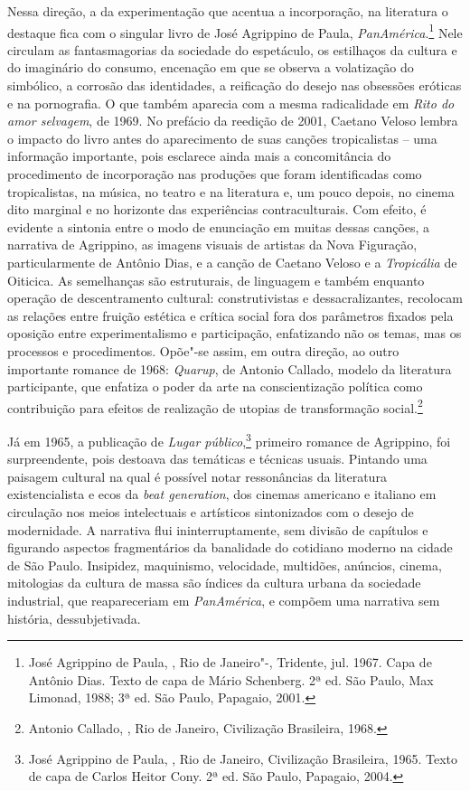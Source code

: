 Nessa direção, a da experimentação que acentua a incorporação, na
literatura o destaque fica com o singular livro de José Agrippino de
Paula, \emph{PanAmérica}.\footnote{José Agrippino de Paula,
  {}, Rio de Janeiro"-, Tridente, jul. 1967. Capa de
  Antônio Dias. Texto de capa de Mário Schenberg. 2ª ed. São Paulo, Max
  Limonad, 1988; 3ª ed. São Paulo, Papagaio, 2001.} Nele circulam as
fantasmagorias da sociedade do espetáculo, os estilhaços da cultura e do
imaginário do consumo, encenação em que se observa a volatização do
simbólico, a corrosão das identidades, a reificação do desejo nas
obsessões eróticas e na pornografia. O que também aparecia com a mesma
radicalidade em \emph{Rito do amor selvagem}, de 1969. No prefácio da
reedição de 2001, Caetano Veloso lembra o impacto do livro antes do
aparecimento de suas canções tropicalistas -- uma informação importante,
pois esclarece ainda mais a concomitância do procedimento de
incorporação nas produções que foram identificadas como tropicalistas,
na música, no teatro e na literatura e, um pouco depois, no cinema dito
marginal e no horizonte das experiências contraculturais. Com efeito, é
evidente a sintonia entre o modo de enunciação em muitas dessas canções,
a narrativa de Agrippino, as imagens visuais de artistas da Nova
Figuração, particularmente de Antônio Dias, e a canção de Caetano Veloso
e a \emph{Tropicália} de Oiticica. As semelhanças são estruturais, de
linguagem e também enquanto operação de descentramento cultural:
construtivistas e dessacralizantes, recolocam as relações entre fruição
estética e crítica social fora dos parâmetros fixados pela oposição
entre experimentalismo e participação, enfatizando não os temas, mas os
processos e procedimentos. Opõe"-se assim, em outra direção, ao outro
importante romance de 1968: \emph{Quarup}, de Antonio Callado, modelo da
literatura participante, que enfatiza o poder da arte na conscientização
política como contribuição para efeitos de realização de utopias de
transformação social.\footnote{Antonio Callado, {}, Rio de
  Janeiro, Civilização Brasileira, 1968.}

Já em 1965, a publicação de \emph{Lugar público},\footnote{José
  Agrippino de Paula, {}, Rio de Janeiro, Civilização
  Brasileira, 1965. Texto de capa de Carlos Heitor Cony. 2ª ed. São
  Paulo, Papagaio, 2004.} primeiro romance de Agrippino, foi
surpreendente, pois destoava das temáticas e técnicas usuais. Pintando
uma paisagem cultural na qual é possível notar ressonâncias da
literatura existencialista e ecos da \emph{beat generation}, dos cinemas
americano e italiano em circulação nos meios intelectuais e artísticos
sintonizados com o desejo de modernidade. A narrativa flui
ininterruptamente, sem divisão de capítulos e figurando aspectos
fragmentários da banalidade do cotidiano moderno na cidade de São Paulo.
Insipidez, maquinismo, velocidade, multidões, anúncios, cinema,
mitologias da cultura de massa são índices da cultura urbana da
sociedade industrial, que reapareceriam em \emph{PanAmérica}, e compõem
uma narrativa sem história, dessubjetivada.


